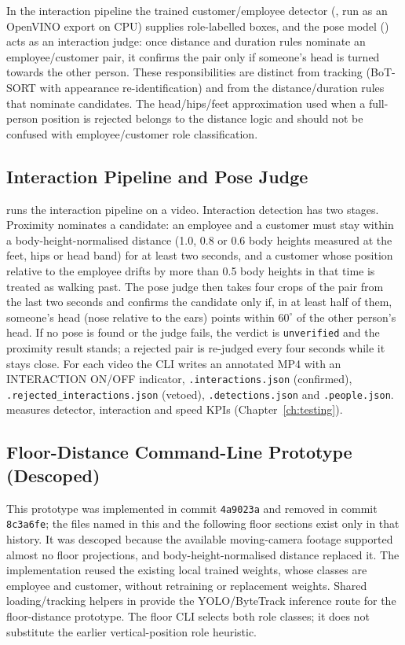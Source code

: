 In the interaction pipeline the trained customer/employee detector (, run as an OpenVINO export on CPU) supplies role-labelled boxes, and the pose model () acts as an interaction judge: once distance and duration rules nominate an employee/customer pair, it confirms the pair only if someone's head is turned towards the other person. These responsibilities are distinct from tracking (BoT-SORT with appearance re-identification) and from the distance/duration rules that nominate candidates. The head/hips/feet approximation used when a full-person position is rejected belongs to the distance logic and should not be confused with employee/customer role classification.

\subsection{Interaction Pipeline and Pose Judge}
 runs the interaction pipeline on a video. Interaction detection has two stages. Proximity nominates a candidate: an employee and a customer must stay within a body-height-normalised distance (1.0, 0.8 or 0.6 body heights measured at the feet, hips or head band) for at least two seconds, and a customer whose position relative to the employee drifts by more than 0.5 body heights in that time is treated as walking past. The pose judge then takes four crops of the pair from the last two seconds and confirms the candidate only if, in at least half of them, someone's head (nose relative to the ears) points within $60^\circ$ of the other person's head. If no pose is found or the judge fails, the verdict is \texttt{unverified} and the proximity result stands; a rejected pair is re-judged every four seconds while it stays close. For each video the CLI writes an annotated MP4 with an INTERACTION ON/OFF indicator, \texttt{.interactions.json} (confirmed), \texttt{.rejected\_interactions.json} (vetoed), \texttt{.detections.json} and \texttt{.people.json}.  measures detector, interaction and speed KPIs (Chapter~\ref{ch:testing}).

\subsection{Floor-Distance Command-Line Prototype (Descoped)}
\label{sec:floor-descoped}
This prototype was implemented in commit \texttt{4a9023a} and removed in commit \texttt{8c3a6fe}; the files named in this and the following floor sections exist only in that history. It was descoped because the available moving-camera footage supported almost no floor projections, and body-height-normalised distance replaced it. The implementation reused the existing local trained  weights, whose classes are employee and customer, without retraining or replacement weights. Shared loading/tracking helpers in  provide the YOLO/ByteTrack inference route for the floor-distance prototype. The floor CLI selects both role classes; it does not substitute the earlier vertical-position role heuristic.


